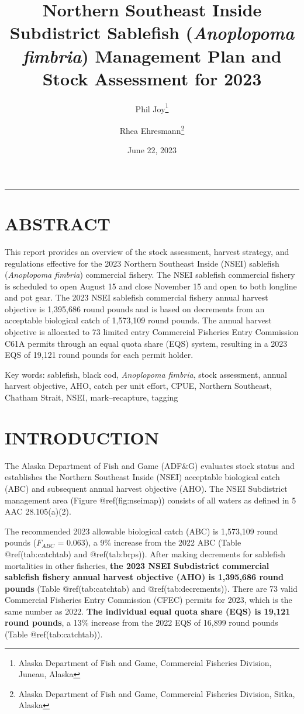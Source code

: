 \documentclass[
]{article}
\title{Northern Southeast Inside Subdistrict Sablefish (\emph{Anoplopoma
fimbria}) Management Plan and Stock Assessment for 2023}
\author{Phil Joy\footnote{Alaska Department of Fish and Game, Commercial
  Fisheries Division, Juneau, Alaska} \and Rhea Ehresmann\footnote{Alaska
  Department of Fish and Game, Commercial Fisheries Division, Sitka,
  Alaska}}
\date{June 22, 2023}
\begin{document}
\maketitle

{
\setcounter{tocdepth}{2}
\tableofcontents
}
\begin{center}\rule{0.5\linewidth}{0.5pt}\end{center}

\hypertarget{abstract}{%
\section{ABSTRACT}\label{abstract}}

This report provides an overview of the stock assessment, harvest
strategy, and regulations effective for the 2023 Northern Southeast
Inside (NSEI) sablefish (\emph{Anoplopoma fimbria}) commercial fishery.
The NSEI sablefish commercial fishery is scheduled to open August 15 and
close November 15 and open to both longline and pot gear. The 2023 NSEI
sablefish commercial fishery annual harvest objective is 1,395,686 round
pounds and is based on decrements from an acceptable biological catch of
1,573,109 round pounds. The annual harvest objective is allocated to 73
limited entry Commercial Fisheries Entry Commission C61A permits through
an equal quota share (EQS) system, resulting in a 2023 EQS of 19,121
round pounds for each permit holder.

Key words: sablefish, black cod, \emph{Anoplopoma fimbria}, stock
assessment, annual harvest objective, AHO, catch per unit effort, CPUE,
Northern Southeast, Chatham Strait, NSEI, mark--recapture, tagging

\hypertarget{introduction}{%
\section{INTRODUCTION}\label{introduction}}

The Alaska Department of Fish and Game (ADF\&G) evaluates stock status
and establishes the Northern Southeast Inside (NSEI) acceptable
biological catch (ABC) and subsequent annual harvest objective (AHO).
The NSEI Subdistrict management area (Figure @ref(fig:nseimap)) consists
of all waters as defined in 5 AAC 28.105(a)(2).

The recommended 2023 allowable biological catch (ABC) is 1,573,109 round
pounds (\(F_{ABC}\) = 0.063), a 9\% increase from the 2022 ABC (Table
@ref(tab:catchtab) and @ref(tab:brps)). After making decrements for
sablefish mortalities in other fisheries, \textbf{the 2023 NSEI
Subdistrict commercial sablefish fishery annual harvest objective (AHO)
is {1,395,686} round pounds} (Table @ref(tab:catchtab) and
@ref(tab:decrements)). There are 73 valid Commercial Fisheries Entry
Commission (CFEC) permits for 2023, which is the same number as 2022.
\textbf{The individual equal quota share (EQS) is {19,121 } round
pounds}, a {13\%} increase from the 2022 EQS of 16,899 round pounds
(Table @ref(tab:catchtab)).
\end{document}
